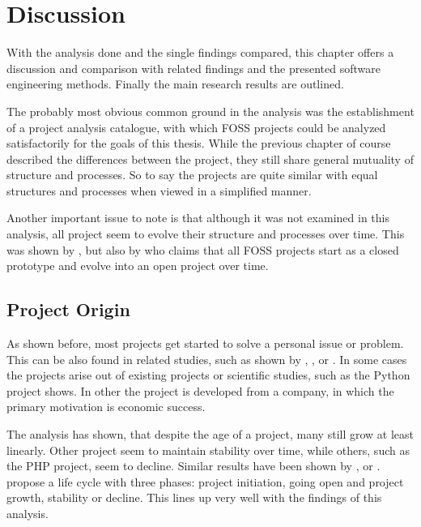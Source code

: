 \chapter{Discussion} %
\label{chap:discussion}

With the analysis done and the single findings compared, this chapter offers a
discussion and comparison with related findings and the presented software
engineering methods. Finally the main research results are outlined.

The probably most obvious common ground in the analysis was the establishment
of a project analysis catalogue, with which \ac{FOSS} projects could be
analyzed satisfactorily for the goals of this thesis. While the previous
chapter of course described the differences between the project, they still
share general mutuality of structure and processes. So to say the projects are
quite similar with equal structures and processes when viewed in a simplified
manner.

Another important issue to note is that although it was not examined in this
analysis, all project seem to evolve their structure and processes over time.
This was shown by \textcite{Scacchi2006}, \textcite{Godfrey2000} but also by
\textcite{Johnson2001} who claims that all \ac{FOSS} projects start as a closed
prototype and evolve into an open project over time.

\section{Project Origin} %

As shown before, most projects get started to solve a personal issue or
problem. This can be also found in related studies, such as shown by
\textcite{Raymond1998}, \textcite{Lakhani2003}, \cite{Hertel2003} or
\textcite{Johnson2001}. In some cases the projects arise out of existing
projects or scientific studies, such as the Python project shows. In other the
project is developed from a company, in which the primary motivation is
economic success.

The analysis has shown, that despite the age of a project, many still grow at
least linearly. Other project seem to maintain stability over time, while
others, such as the PHP project, seem to decline. Similar results have been
shown by \textcite{Godfrey2000}, \textcite{Roets2007} or \textcite{Ogawa2007}.
\textcite{Schweik2003} propose a life cycle with three phases: project
initiation, going open and project growth, stability or decline. This lines up
very well with the findings of this analysis.

